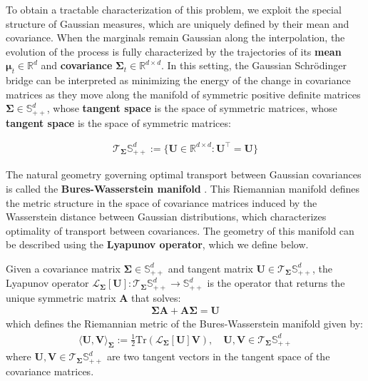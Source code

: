 \documentclass{article}
\newcommand{\boldtext}[1]{\textbf{\textcolor{MyGreen}{#1}}}
\begin{document}
To obtain a tractable characterization of this problem, we exploit the special structure of Gaussian measures, which are uniquely defined by their mean and covariance. When the marginals remain Gaussian along the interpolation, the evolution of the process is fully characterized by the trajectories of its \textbf{mean} $\boldsymbol{\mu}_t\in \mathbb{R}^d$ and \textbf{covariance} $\boldsymbol{\Sigma }_t\in \mathbb{R}^{d\times d}$. In this setting, the Gaussian Schrödinger bridge can be interpreted as minimizing the energy of the change in covariance matrices as they move along the manifold of symmetric positive definite matrices $\boldsymbol{\Sigma}\in\mathbb{S}_{++}^d$, whose \textbf{tangent space} is the space of symmetric matrices, whose \textbf{tangent space} is the space of symmetric matrices:

\begin{align}
    \mathcal{T}_{\boldsymbol{\Sigma}}\mathbb{S}^d_{++}:=\{\boldsymbol{U}\in \mathbb{R}^{d\times d}: \boldsymbol{U}^\top =\boldsymbol{U}\}
\end{align}

The natural geometry governing optimal transport between Gaussian covariances is called the \boldtext{Bures-Wasserstein manifold} \citep{takatsu2010wasserstein, bhatia2019bures}. This Riemannian manifold defines the metric structure in the space of covariance matrices induced by the Wasserstein distance between Gaussian distributions, which characterizes optimality of transport between covariances. The geometry of this manifold can be described using the \boldtext{Lyapunov operator}, which we define below.

\begin{definition}\label{def:bures-wasserstein}
    Given a covariance matrix $\boldsymbol{\Sigma}\in \mathbb{S}^d_{++}$ and tangent matrix $\boldsymbol{U}\in \mathcal{T}_{\boldsymbol{\Sigma}}\mathbb{S}^d_{++}$, the Lyapunov operator $\mathcal{L}_{\boldsymbol{\Sigma}}[\boldsymbol{U}]: \mathcal{T}_{\boldsymbol{\Sigma}}\mathbb{S}^d_{++}\to \mathbb{S}^d_{++}$ is the operator that returns the unique symmetric matrix  $\boldsymbol{A}$ that solves:
    \begin{align}
        \boldsymbol{\Sigma}\boldsymbol{A}+\boldsymbol{A}\boldsymbol{\Sigma}=\boldsymbol{U}
    \end{align}
    which defines the Riemannian metric of the Bures-Wasserstein manifold given by:
    \begin{align}
        \langle \boldsymbol{U}, \boldsymbol{V}\rangle_{\boldsymbol{\Sigma}}:=\frac{1}{2}\text{Tr}(\mathcal{L}_{\boldsymbol{\Sigma}}[\boldsymbol{U}]\boldsymbol{V}), \quad \boldsymbol{U}, \boldsymbol{V}\in \mathcal{T}_{\boldsymbol{\Sigma}}\mathbb{S}^d_{++}\label{eq:bw-metric}
    \end{align}
    where $\boldsymbol{U}, \boldsymbol{V}\in \mathcal{T}_{\boldsymbol{\Sigma}}\mathbb{S}^d_{++}$ are two tangent vectors in the tangent space of the covariance matrices. 
\end{definition}
\end{document}
